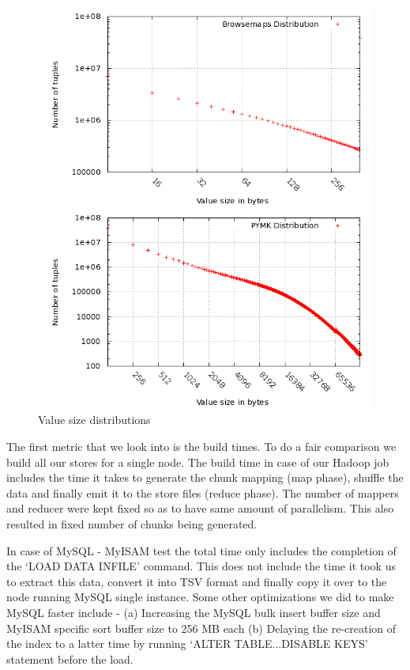 \documentclass[10pt,twocolumn,preprint,natbib,authoryear]{sigplanconf}
\begin{document}
\begin{figure}
  \centering
    \includegraphics[scale=0.35]{distribution.png}
  \caption{Value size distributions}
  \label{distribution}
\end{figure}

The first metric that we look into is the build times. To do a fair comparison we build all our stores for a single node. The build time in case of our Hadoop job includes the time it takes to generate the chunk mapping (map phase), shuffle the data and finally emit it to the store files (reduce phase). The number of mappers and reducer were kept fixed so as to have same amount of parallelism. This also resulted in fixed number of chunks being generated.

In case of MySQL - MyISAM test the total time only includes the completion of the `LOAD DATA INFILE' command. This does not include the time it took us to extract this data, convert it into TSV format and finally copy it over to the node running MySQL single instance. Some other optimizations we did to make MySQL faster include - (a) Increasing the MySQL bulk insert buffer size and MyISAM specific sort buffer size to 256 MB each (b) Delaying the re-creation of the index to a latter time by running `ALTER TABLE...DISABLE KEYS' statement before the load. 
\end{document}
